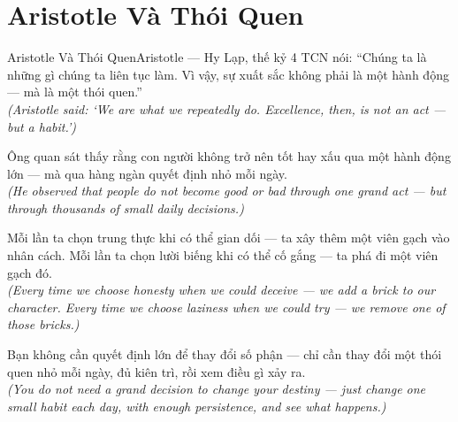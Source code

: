 \section{Aristotle Và Thói Quen}
\begin{truyen}{Aristotle Và Thói Quen}{Aristotle --- Hy Lạp, thế kỷ 4 TCN}
 nói: ``Chúng ta là những gì chúng ta liên tục làm. Vì vậy, sự xuất sắc không phải là một hành động --- mà là một thói quen.''\\[4pt]
\textit{(Aristotle said: `We are what we repeatedly do. Excellence, then, is not an act --- but a habit.')}

Ông quan sát thấy rằng con người không trở nên tốt hay xấu qua một hành động lớn --- mà qua hàng ngàn quyết định nhỏ mỗi ngày.\\[4pt]
\textit{(He observed that people do not become good or bad through one grand act --- but through thousands of small daily decisions.)}

Mỗi lần ta chọn trung thực khi có thể gian dối --- ta xây thêm một viên gạch vào nhân cách. Mỗi lần ta chọn lười biếng khi có thể cố gắng --- ta phá đi một viên gạch đó.\\[4pt]
\textit{(Every time we choose honesty when we could deceive --- we add a brick to our character. Every time we choose laziness when we could try --- we remove one of those bricks.)}

\end{truyen}
\begin{baihoc}
  Bạn không cần quyết định lớn để thay đổi số phận --- chỉ cần thay đổi một thói quen nhỏ mỗi ngày, đủ kiên trì, rồi xem điều gì xảy ra.\\[4pt]
  \textit{(You do not need a grand decision to change your destiny --- just change one small habit each day, with enough persistence, and see what happens.)}
\end{baihoc}

